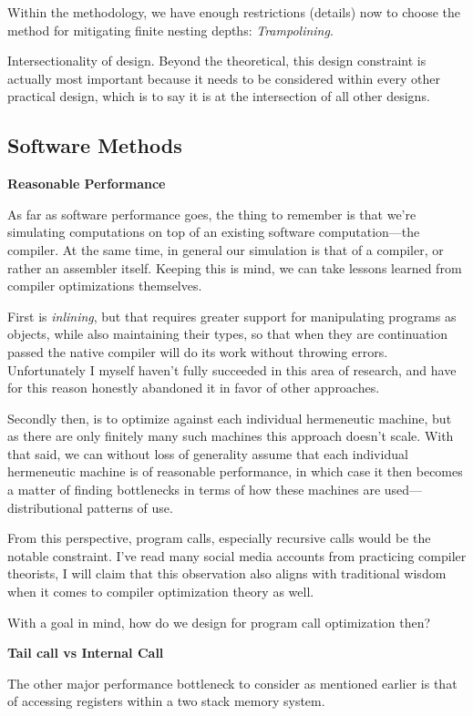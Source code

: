 \documentclass[twoside]{article}
\newcommand{\strong}[1]{{\bfseries #1}}
\begin{document}
Within the methodology, we have enough restrictions (details) now to choose the method for mitigating finite
nesting depths: \emph{Trampolining}.

Intersectionality of design. Beyond the theoretical, this design constraint is actually most important because
it needs to be considered within every other practical design, which is to say it is at the intersection of all
other designs.

\subsection*{Software Methods}

\strong{Reasonable Performance}

As far as software performance goes, the thing to remember is that we're simulating computations on top of
an existing software computation---the compiler. At the same time, in general our simulation is that of a compiler,
or rather an assembler itself. Keeping this is mind, we can take lessons learned from compiler optimizations themselves.

First is \emph{inlining}, but that requires greater support for manipulating programs as objects, while also maintaining
their types, so that when they are continuation passed the native compiler will do its work without throwing errors.
Unfortunately I myself haven't fully succeeded in this area of research, and have for this reason honestly abandoned
it in favor of other approaches.

Secondly then, is to optimize against each individual hermeneutic machine, but as there are only finitely many such
machines this approach doesn't scale. With that said, we can without loss of generality assume that each individual
hermeneutic machine is of reasonable performance, in which case it then becomes a matter of finding bottlenecks
in terms of how these machines are used---distributional patterns of use.

From this perspective, program calls, especially recursive calls would be the notable constraint. I've read many
social media accounts from practicing compiler theorists, I will claim that this observation also aligns with
traditional wisdom when it comes to compiler optimization theory as well.

With a goal in mind, how do we design for program call optimization then?

\strong{Tail call vs Internal Call}

The other major performance bottleneck to consider as mentioned earlier is that of accessing registers within
a two stack memory system.
\end{document}

